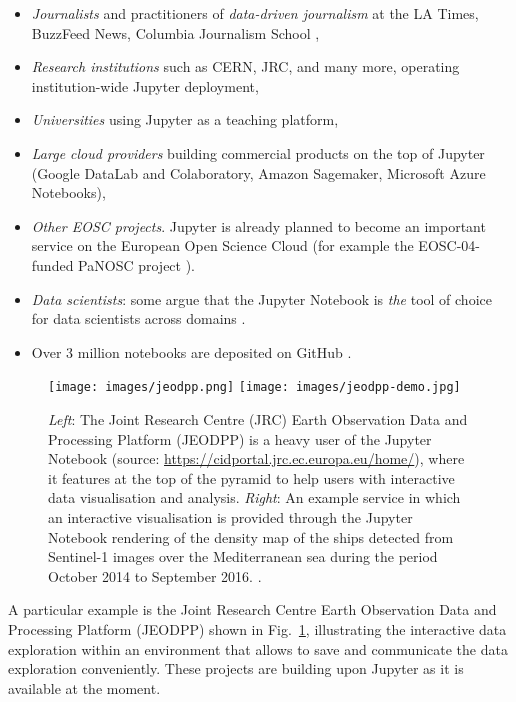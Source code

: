\begin{itemize}
\item \emph{Journalists} and practitioners of \emph{data-driven
    journalism} at the LA Times, BuzzFeed News, Columbia Journalism School \cite{latimes-datadesk} \cite{columbia-nytimes} \cite{data-journalism},
\item \emph{Research institutions} such as CERN, JRC, and many more,
  operating institution-wide Jupyter deployment,
\item \emph{Universities} using Jupyter as a teaching platform,
\item \emph{Large cloud providers} building commercial products on the
  top of Jupyter (Google DataLab and Colaboratory, Amazon Sagemaker, Microsoft Azure
  Notebooks),
\item \emph{Other EOSC projects}. Jupyter is already planned to become
  an important service on the European Open Science Cloud (for example
  the EOSC-04-funded PaNOSC project \cite{panosc}).
\item \emph{Data scientists}: some argue that the Jupyter Notebook is
  \emph{the} tool of choice for data scientists across domains
  \cite{Perkel2018}.
\item Over 3 million notebooks are deposited on GitHub \cite{notebookcount}.
\end{itemize}
%
\begin{figure}[tb]
  \centering\texttt{[image: images/jeodpp.png]}
  \centering\texttt{[image: images/jeodpp-demo.jpg]}
  \caption{\emph{Left}: The Joint Research Centre (JRC) Earth Observation
    Data and Processing Platform (JEODPP) is a heavy user of the
    Jupyter Notebook (source:
    \url{https://cidportal.jrc.ec.europa.eu/home/}), where it features
    at the top of the pyramid to help users with interactive data
    visualisation and analysis. \emph{Right}: An example
    service in which an interactive visualisation is provided through
    the Jupyter Notebook rendering of the density map of the ships
    detected from Sentinel-1 images over the Mediterranean sea during
    the period October 2014 to September 2016. \cite[Figure
    6]{Soille2018}. \label{fig:jeodpp}}
\end{figure}
%
A particular example is the Joint Research Centre Earth Observation
Data and Processing Platform (JEODPP) shown in Fig.~\ref{fig:jeodpp},
illustrating the interactive data exploration within an environment
that allows to save and communicate the data exploration
conveniently. These projects are building upon Jupyter as it is
available at the moment.
\bigskip

